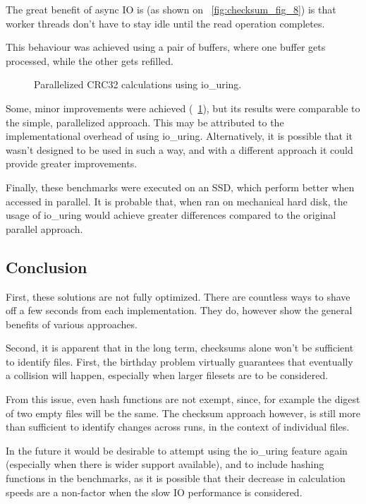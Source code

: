 The great benefit of async IO is (as shown on ~\ref{fig:checksum_fig_8}) is that worker threads
don't have to stay idle until the read operation completes.

This behaviour was achieved using a pair of buffers, where one buffer gets processed, while
the other gets refilled.

\begin{figure}[!htb]
    \centering
    \begin{bchart}[step=50,max=400, unit=s]
        \medskip
        \medskip
        \medskip
        \medskip
    \end{bchart}
    \caption{Parallelized CRC32 calculations using io\_uring.}
    \label{fig:checksum_fig_9}
\end{figure}

Some, minor improvements were achieved (~\ref{fig:checksum_fig_9}), but its results were comparable
to the simple, parallelized approach.
This may be attributed to the implementational overhead of using io\_uring.
Alternatively, it is possible that it wasn't designed to be used in such a way, and with
a different approach it could provide greater improvements.

Finally, these benchmarks were executed on an SSD, which perform better when accessed in parallel.
It is probable that, when ran on mechanical hard disk, the usage of io\_uring would achieve
greater differences compared to the original parallel approach.
\clearpage
\subsection{Conclusion}
First, these solutions are not fully optimized.
There are countless ways to shave off a few seconds from each implementation.
They do, however show the general benefits of various approaches.

Second, it is apparent that in the long term, checksums alone won't be sufficient to identify files.
First, the birthday problem virtually guarantees that eventually a collision will happen,
especially when larger filesets are to be considered.

From this issue, even hash functions are not exempt,
since, for example the digest of two empty files will be the same.
The checksum approach however, is still more than sufficient to identify changes across runs,
in the context of individual files.

In the future it would be desirable to attempt using the io\_uring feature again
(especially when there is wider support available), and to include hashing functions
in the benchmarks, as it is possible that their decrease in calculation speeds are
a non-factor when the slow IO performance is considered.

